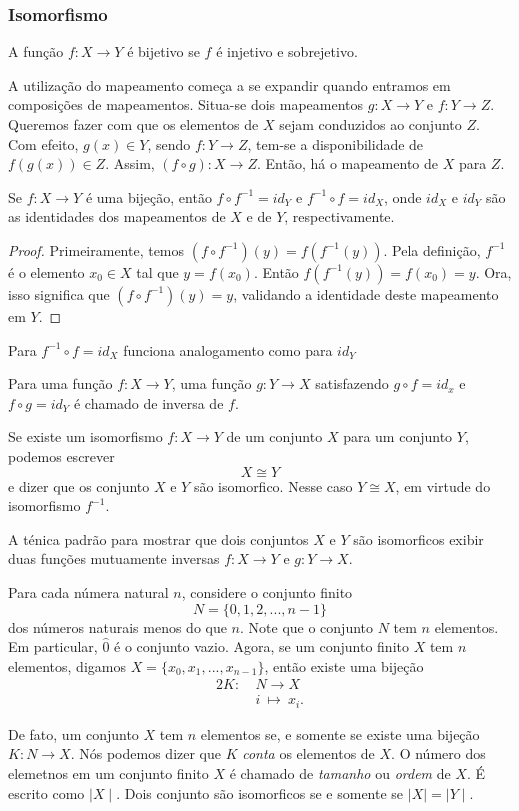 \subsubsection{Isomorfismo}
\begin{definition}
    A função $f:X \to Y$ é bijetivo se $f$ é injetivo e sobrejetivo.
\end{definition}
A utilização do mapeamento começa a se expandir quando entramos em composições de mapeamentos. Situa-se dois mapeamentos $g:X \to Y$ e $f:Y \to Z$. Queremos fazer com que os elementos de $X$ sejam conduzidos ao conjunto $Z$. Com efeito, $g(x) \in Y$, sendo $f:Y \to Z$, tem-se a disponibilidade de $f(g(x)) \in Z$. Assim, $(f\circ g):X \to Z$. Então, há o mapeamento de $X$ para $Z$.
\begin{lemma}
  Se $f:X \to Y$ é uma bijeção, então $f\circ f^{-1} = id_{Y}$ e $f^{-1} \circ f=id_{X}$, onde $id_{X}$ e $id_{Y}$ são as identidades dos mapeamentos de $X$ e de $Y$, respectivamente.
  \begin{proof}
    Primeiramente, temos $(f\circ f^{-1})(y)=f(f^{-1}(y))$. Pela definição, $f^{-1}$ é o elemento $x_{0}\in X$ tal que $y=f(x_{0})$. Então $f(f^{-1}(y))=f(x_{0})=y$. Ora, isso significa que $(f\circ f^{-1})(y) = y$, validando a identidade deste mapeamento em $Y$.
  \end{proof}
\end{lemma}
Para $f^{-1}\circ f = id_{X}$ funciona analogamento como para $id_{Y}$
\begin{definition}
  Para uma função $f: X \to Y$, uma função $g: Y \to X$ satisfazendo $g \circ f = id_{x}$ e $f \circ g = id_{Y}$ é chamado de inversa de $f$.
\end{definition}
Se existe um isomorfismo $f: X \to Y$ de um conjunto $X$ para um conjunto $Y$, podemos escrever $$X \cong Y$$ e dizer que os conjunto $X$ e $Y$ são isomorfico. Nesse caso $Y \cong X$, em virtude do isomorfismo $f^{-1}$. 

A ténica padrão para mostrar que dois conjuntos $X$ e $Y$ são isomorficos exibir duas funções mutuamente inversas $f: X \to Y$ e $g: Y \to X$.

\begin{exmp}
  Para cada númera natural $n$, considere o conjunto finito $$N = \{0,1,2, ..., n -1\}$$
  dos números naturais menos do que $n$. Note que o conjunto $N$ tem $n$ elementos. Em particular, $\widehat{0}$ é o conjunto vazio. Agora, se um conjunto finito $X$ tem $n$ elementos, digamos $X = \{x_{0},x_{1},...,x_{n-1}\}$, então existe uma bijeção
  \begin{alignat}{2}
    K:\ &N \to X \nonumber\\
    &i\ \mapsto\ x_{i}.
    \nonumber
  \end{alignat}
\end{exmp}
De fato, um conjunto $X$ tem $n$ elementos se, e somente se existe uma bijeção $K: N\to X$. Nós podemos dizer que $K$ \emph{conta}  os elementos de $X$. O número dos elemetnos em um conjunto finito $X$ é chamado de \emph{tamanho} ou \emph{ordem} de $X$. É escrito como $\mid X\mid$. Dois conjunto são isomorficos se e somente se $\mid X\mid = \mid Y\mid$.

